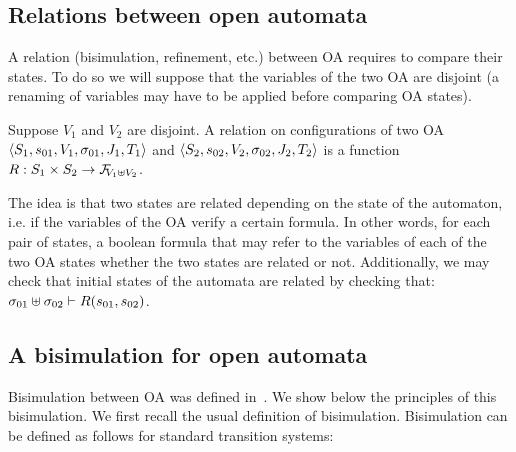 \documentclass[runningheads]{llncs}
\begin{document}

\subsection{Relations between open automata}
A relation (bisimulation, refinement, etc.) between OA requires to compare their states. To do so we will suppose that the variables of the two OA are disjoint (a renaming of variables may have to be applied before comparing OA states).
\begin{definition} Suppose $V_1$ and $V_2$ are disjoint.
A relation on configurations of two OA \(\OAg[1]\) and \(\OAg[2]\) is a function \(R: S_1 \times S_2 \to \rformulas[V_1 \uplus V_2]\).
\end{definition}
The idea is that two states are related depending on the state of the automaton, i.e. if the variables of the OA verify a certain formula. 
In other words, for each pair of states, a boolean formula that may refer to the  variables of each of the two OA states whether the two states are related or not.
Additionally, we may check that initial states of the automata are related by checking that: \(\sigma_{01} \uplus \sigma_{02} \vdash R\mpar{s_{01}, s_{02}}\).


\subsection{A bisimulation for open automata}

Bisimulation between OA was defined in~\cite{fhbisim}.  We show below the principles of this bisimulation. We first recall the usual definition of bisimulation.
Bisimulation can  be defined as follows for standard transition systems: 
\end{document}
